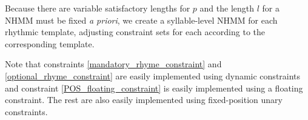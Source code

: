 \documentclass[phd,electronic,oneside,twosidetoc,letterpaper,chaptercenter,parttop,lol,lof,lot]{byumsphd}
\begin{document}
Because there are variable satisfactory lengths for $p$ and the length $l$ for a NHMM must be fixed \textit{a priori}, we create a syllable-level NHMM for each rhythmic template, adjusting constraint sets for each according to the corresponding template. %

Note that constraints \ref{mandatory_rhyme_constraint} and \ref{optional_rhyme_constraint} are easily implemented using dynamic constraints and constraint \ref{POS_floating_constraint} is easily implemented using a floating constraint. The rest are also easily implemented using fixed-position unary constraints.
\end{document}
